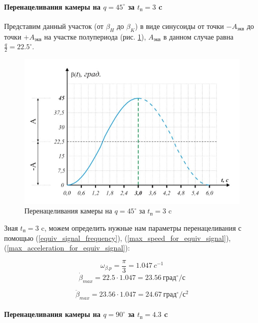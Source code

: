 \paragraph{Перенацеливания камеры на $q = 45^{\circ}$ за $t_{\text{п}} = 3$ c}

Представим данный участок (от $\beta_{H}$ до $\beta_{K}$) в виде синусоиды от
точки $-A_\text{экв}$ до точки $+A_\text{экв}$ на участке полупериода
(рис. \ref{retarget_45grad_3sec}), $A_\text{экв}$ в данном случае равна
$\frac{q}{2} = 22.5^{\circ}$.

\begin{figure}[h!]
    \centering
    \includegraphics[keepaspectratio]{./src/pictures/retarget_equivalent_input_signals/45grad_3sec}
    \caption{Перенацеливания камеры на $q = 45^{\circ}$ за $t_\text{п} = 3$ c}
    \label{retarget_45grad_3sec}
\end{figure}

Зная $t_{\text{п} } = 3$ c, можем определить нужные нам параметры перенацеливания
с помощью (\ref{equiv_signal_frequency}),
(\ref{max_speed_for_equiv_signal}),
(\ref{max_acceleration_for_equiv_signal}):

$$
    \omega_{\beta.p} = \frac{\pi}{3} = 1.047 ~c^{-1}
$$
$$
    \dot{\beta}_{max} = 22.5 \cdot 1.047 = 23.56 ~\text{град}^{\circ} / \text{с}
$$

$$
    \ddot{\beta}_{max} = 23.56 \cdot 1.047 = 24.67 ~\text{град}^{\circ} / \text{с}^{2}
$$

\paragraph{Перенацеливания камеры на $q = 90^{\circ}$ за $t_\text{п} = 4.3$ c}

